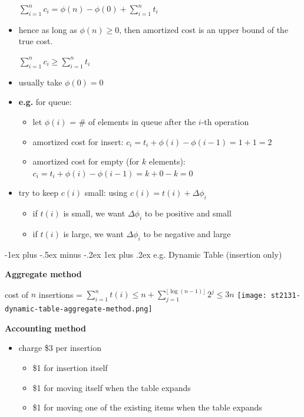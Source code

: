 \documentclass[10pt, landscape]{article}
\makeatletter
\renewcommand{\subsubsection}{\@startsection{subsubsection}{3}{0mm}%
  {-1ex plus -.5ex minus -.2ex}%
  {1ex plus .2ex}%
{\normalfont\small\bfseries}}%
\makeatother
\begin{document}
\begin{multicols*}{4}
\begin{itemize}
\begin{tightcenter}
        $\sum^n_{i=1} c_i = \phi(n) - \phi(0) + \sum^n_{i=1} t_i$
      \end{tightcenter}
    \item hence as long as $\phi(n) \geq 0$, then amortized cost is an upper bound of the true cost. 
      \begin{tightcenter}
        $\sum^n_{i=1} c_i \geq \sum^n_{i=1} t_i$
      \end{tightcenter}
    \item usually take $\phi(0) = 0$
    \item \textbf{e.g.} for queue:
      \begin{itemize}
        \item let $\phi(i)$ = \# of elements in queue after the $i$-th operation
        \item amortized cost for insert: $c_i = t_i + \phi(i) - \phi(i-1) = 1 + 1 = 2$
        \item amortized cost for empty (for $k$ elements): $c_i = t_i + \phi(i) - \phi(i-1) = k + 0 - k = 0 $
      \end{itemize}
    \item try to keep $c(i)$ small: using $c(i) = t(i) + \Delta \phi_i$
      \begin{itemize}
        \item if $t(i)$ is small, we want $\Delta \phi_i$ to be positive and small
        \item if $t(i)$ is large, we want $\Delta \phi_i$ to be negative and large 
      \end{itemize}
  \end{itemize}

  \subsubsection{e.g. Dynamic Table (insertion only)}

  \textbf{Aggregate method}

  \begin{tightcenter}
    cost of $n$ insertions = $\sum^n_{i=1} t(i) \leq n + \sum^{ \lfloor \log(n-1) \rfloor  }_{j=1} 2^j \leq 3n$
    \texttt{[image: st2131-dynamic-table-aggregate-method.png]} 
  \end{tightcenter}

  \textbf{Accounting method}

  \begin{itemize}
    \item charge \$3 per insertion
      \begin{itemize}
        \item \$1 for insertion itself
        \item \$1 for moving itself when the table expands
        \item \$1 for moving one of the existing items when the table expands
      \end{itemize}
  \end{itemize}


\end{multicols*}
\end{document}
